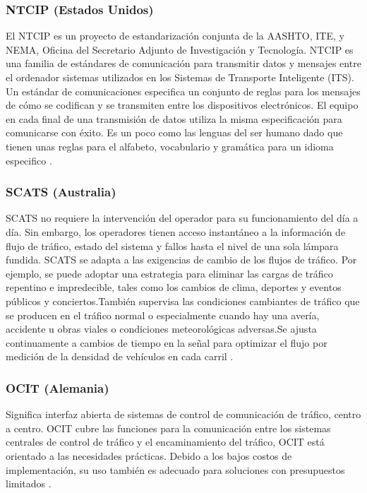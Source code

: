 \subsubsection{NTCIP (Estados Unidos)}
El NTCIP es un proyecto de estandarización conjunta de la AASHTO, ITE, y NEMA, Oficina del Secretario Adjunto de 
Investigación y Tecnología. NTCIP es una familia de estándares de comunicación para transmitir datos y mensajes 
entre el ordenador sistemas utilizados en los Sistemas de Transporte Inteligente (ITS). 
Un estándar de comunicaciones especifica un conjunto de reglas para los mensajes de cómo se codifican y se transmiten 
entre los dispositivos electrónicos. El equipo en cada final de una transmisión de datos utiliza la misma especificación 
para comunicarse con éxito. Es un poco como las lenguas del ser humano dado que tienen unas reglas para el alfabeto, 
vocabulario y gramática para un idioma especifico \cite{9}.
\subsubsection{SCATS (Australia)}
SCATS no requiere la intervención del operador para su funcionamiento del día a día. Sin embargo, los operadores tienen 
acceso instantáneo a la información de flujo de tráfico, estado del sistema y fallos hasta el nivel de una sola lámpara 
fundida. 
SCATS  se adapta a las exigencias de cambio de los flujos de tráfico. Por ejemplo, se puede adoptar una estrategia para 
eliminar las cargas de tráfico repentino e impredecible, tales como los cambios de clima, deportes y eventos públicos y 
conciertos.También supervisa las condiciones cambiantes de tráfico que se producen en el tráfico normal o especialmente 
cuando hay una avería, accidente u obras viales o condiciones meteorológicas adversas.Se ajusta continuamente a cambios 
de tiempo en la señal para optimizar el flujo por medición de la densidad de vehículos en cada carril \cite{10}.
\subsubsection{OCIT (Alemania)}
Significa interfaz abierta de sistemas de control de comunicación de tráfico, centro a centro. OCIT cubre las 
funciones para la comunicación entre los sistemas centrales de control de tráfico y el encaminamiento del tráfico, 
OCIT está orientado a las necesidades prácticas. Debido a los bajos costos de implementación, su uso también es adecuado 
para soluciones con presupuestos limitados \cite{11}.
